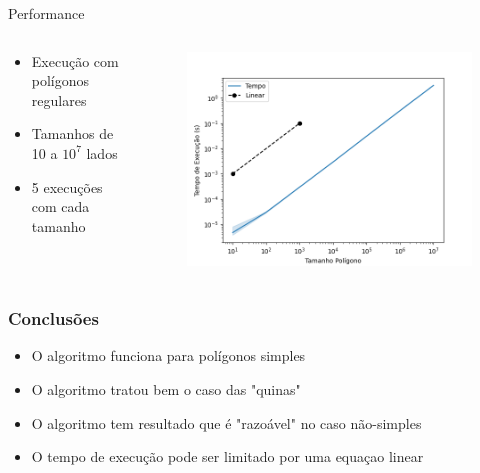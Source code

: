 \documentclass[aspectratio=169,usenames,dvipsnames]{beamer}
\begin{document}
\begin{frame}{Performance}

  \begin{columns}
    \begin{center}
      \begin{itemize}
        \item Execução com polígonos regulares
        \item Tamanhos de 10 a $10^7$ lados
        \item 5 execuções com cada tamanho
      \end{itemize}
    \end{center}
    \begin{center}   
      \begin{figure}
        \includegraphics[width=1.0\textwidth]{figures/performance.png}
      \end{figure}
    \end{center}
  \end{columns}

\end{frame}

\begin{frame}
\frametitle{Conclusões}

\begin{itemize}
  \item O algoritmo funciona para polígonos simples
  \item O algoritmo tratou bem o caso das "quinas"
  \item O algoritmo tem resultado que é "razoável" no caso não-simples
  \item O tempo de execução pode ser limitado por uma equaçao linear
\end{itemize}

\end{frame}
\end{document}
